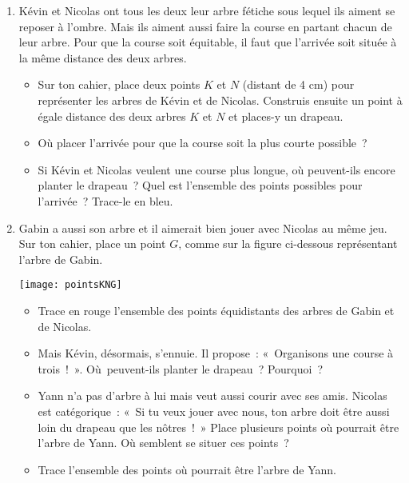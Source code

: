 \begin{exercice}
\begin{enumerate}
 \item Kévin et Nicolas ont tous les deux leur arbre fétiche sous lequel ils aiment se reposer à l'ombre. Mais ils aiment aussi faire la course en partant chacun de leur arbre. Pour que la course soit équitable, il faut que l'arrivée soit située à la même distance des deux arbres.
 \begin{itemize}
  \item Sur ton cahier, place deux points $K$ et $N$ (distant de 4 cm) pour représenter les arbres de Kévin et de Nicolas. Construis ensuite un point à égale distance des deux arbres $K$ et $N$ et places-y un drapeau.
  \item Où placer l'arrivée pour que la course soit la plus courte possible ?
  \item Si Kévin et Nicolas veulent une course plus longue, où peuvent-ils encore planter le drapeau ? Quel est l'ensemble des points possibles pour l'arrivée ? Trace-le en bleu. 
  \end{itemize}
 \item Gabin a aussi son arbre et il aimerait bien jouer avec Nicolas au même jeu. Sur ton cahier, place un point $G$, comme sur la figure ci-dessous représentant l'arbre de Gabin.
 \begin{center} \texttt{[image: pointsKNG]} \end{center}
 \begin{itemize}
  \item Trace \textcolor{}{en rouge} l'ensemble des points équidistants des arbres de Gabin et de Nicolas.
  \item Mais Kévin, désormais, s'ennuie. Il propose : « Organisons une course à trois ! ». Où peuvent-ils planter le drapeau ? Pourquoi ? 
  \item Yann n'a pas d'arbre à lui mais veut aussi courir avec ses amis. Nicolas est catégorique : « Si tu veux jouer avec nous, ton arbre doit être aussi loin du drapeau que les nôtres ! » Place plusieurs points où pourrait être l'arbre de Yann. Où semblent se situer ces points ? 
  \item Trace l'ensemble des points où pourrait être l'arbre de Yann.
  \end{itemize}
 \end{enumerate}
\end{exercice}
